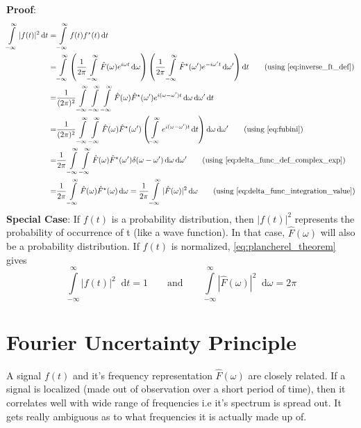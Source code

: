 \documentclass[11pt, a4paper]{article}
\let\oldsection\section
\renewcommand{\section}{%
	\setcounter{equation}{0}%
	\oldsection%
}
\newcommand{\primed}[1]{#1^{\prime}}
\newcommand{\omegap}{\primed{\omega}}	%
\newcommand{\diff}{\mathop{}\!\mathrm{d}}
\newcommand{\dt}{\diff t}
\newcommand{\domega}{\diff \omega}
\newcommand{\domegap}{\diff \omegap}
\newcommand{\dint}[2]{\int \limits_{#1}^{#2}}  %
\newcommand{\intinfty}{\dint{-\infty}{\infty}}	%
\newcommand{\iintinfty}{\intinfty \intinfty}	%
\newcommand{\iiintinfty}{\intinfty \intinfty \intinfty}	%
\begin{document}
\vspace{4pt}
\noindent
\textbf{Proof}: 
\begin{align*}
	\intinfty |f(t)|^{2} \dt 
	= & \intinfty f(t)f^{\star}(t) \dt \\
	= & \intinfty \left(\frac{1}{2 \pi} \intinfty \hat{F}(\omega) e^{i \omega t} \domega \right) \left(\frac{1}{2 \pi} \intinfty \hat{F}^{\star}(\omegap) e^{-i \omegap t} \domegap \right) \dt \tag{using \eqref{eq:inverse_ft_def}} \\
	= & \frac{1}{(2 \pi)^2} \iiintinfty \hat{F}(\omega) \hat{F}^{\star}(\omegap) e^{i (\omega - \omegap) t} \domega \domegap \dt \\
	= & \frac{1}{(2 \pi)^2} \iintinfty \hat{F}(\omega) \hat{F}^{\star}(\omegap) \left( \intinfty e^{i (\omega - \omegap) t} \dt \right) \domega \domegap \tag{using \eqref{eq:fubini}} \\
	= & \frac{1}{2 \pi} \iintinfty \hat{F}(\omega) \hat{F}^{\star}(\omegap) \delta(\omega - \omegap) \domega \domegap \tag{using \eqref{eq:delta_func_def_complex_exp}} \\
	= & \frac{1}{2 \pi} \intinfty \hat{F}(\omega) \hat{F}^{\star}(\omega) \domega 
	= \frac{1}{2 \pi} \intinfty |\hat{F}(\omega)|^{2} \domega  \tag{using \eqref{eq:delta_func_integration_value}} \\
\end{align*}
\noindent
\textbf{Special Case}: If $f(t)$ is a probability distribution, then $|f(t)|^{2}$ represents the probability of occurrence of t (like a wave function). In that case, $\hat{F}(\omega)$ will also be a probability distribution. If $f(t)$ is normalized, \eqref{eq:plancherel_theorem} gives
\begin{equation}\label{eq:plancherel_normal_func_and_spectrum}
	\intinfty |f(t)|^{2} \dt = 1 \qquad \text{and} \qquad \intinfty |\hat{F}(\omega)|^{2} \domega = 2 \pi
\end{equation}

\section{Fourier Uncertainty Principle}\label{sec:fourier_uncertainity_principle}
A signal $f(t)$ and it's frequency representation $\hat{F}(\omega)$ are closely related. If a signal is localized (made out of observation over a short period of time), then it correlates well with wide range of frequencies i.e it's spectrum is spread out. It gets really ambiguous as to what frequencies it is actually made up of.
\end{document}
